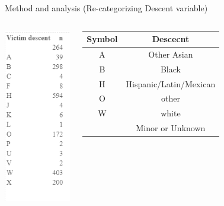 \documentclass{beamer}\usepackage[]{graphicx}\usepackage[]{xcolor}
\makeatletter
\def\maxwidth{ %
  \ifdim\Gin@nat@width>\linewidth
    \linewidth
  \else
    \Gin@nat@width
  \fi
}
\newenvironment{knitrout}{}{} %
\makeatother
\begin{document}
\begin{frame}[fragile]{Method and analysis (Re-categorizing Descent variable)}
\begin{columns}
\begin{knitrout}
\color{fgcolor}
\includegraphics[width=\maxwidth]{figure/Des_categories.png} 
\end{knitrout}

\begin{tabular}{|c||c|}
\hline
    Symbol & Descecnt \\ 
\hline
    A & Other Asian \\ 
\hline
    B & Black \\ 
\hline
H & Hispanic/Latin/Mexican\\
\hline
O & other\\
\hline
W & white\\
\hline
 & Minor or Unknown\\
\hline

\end{tabular}

\end{columns}
\end{frame}
\end{document}
